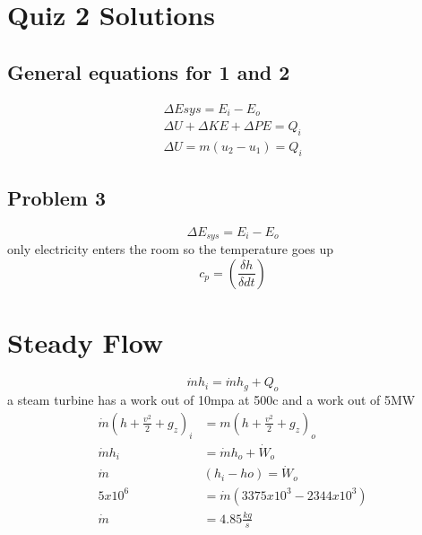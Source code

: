\documentclass[10pt,a4paper]{article}
\begin{document}
\section*{Quiz 2 Solutions}
\subsection*{General equations for 1 and 2}
\begin{align*}
\Delta Esys = E_{i}-E_{o}\\
\Delta U + \Delta KE + \Delta PE = Q_{i}\\
\Delta U = m(u_{2}-u_{1})=Q_{i}
\end{align*}
\subsection*{Problem 3}
\begin{equation*}
\Delta E_{sys}=E_{i}-E_{o}
\end{equation*}
only electricity enters the room so the temperature goes up
\begin{equation*}
c_{p}=\left(\frac{\delta h}{\delta dt}\right)
\end{equation*}
\section*{Steady Flow}
\begin{equation*}
\dot m h_{i}=\dot m h_{g}+Q_{o}
\end{equation*}
a steam turbine has a work out of 10mpa at 500c and a work out of 5MW
\begin{align*}
\dot m (h + \frac{v^{2}}{2}+g_{z})_{i}&=m (h + \frac{v^{2}}{2}+g_{z})_{o}\\
\dot m h_{i}&= \dot m h_{o}+\dot W_{o}\\
\dot m &(h_{i}-h{o}) = \dot W_{o}\\
5x10^{6}&=\dot m (3375x10^{3}-2344x10^{3})\\
\dot m &= 4.85 \frac{kg}{s}
\end{align*}
\end{document}
